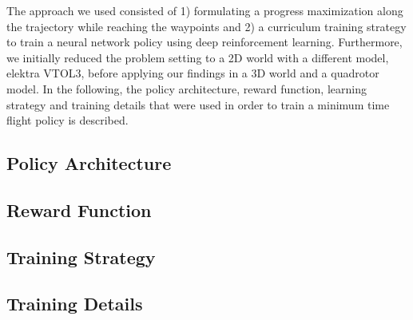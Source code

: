 The approach we used consisted of 1) formulating a progress maximization along the trajectory while reaching the waypoints and 2) a curriculum training strategy to train a neural network policy using deep reinforcement learning. Furthermore, we initially reduced the problem setting to a 2D world with a different model, elektra VTOL3, before applying our findings in a 3D world and a quadrotor model. In the following, the policy architecture, reward function, learning strategy and training details that were used in order to train a minimum time flight policy is described. 

\subsection{Policy Architecture}
\label{subsec:policy_architeture}


\subsection{Reward Function}
\label{subsec:reward_fun}


\subsection{Training Strategy} 
\label{subsec:training_strategy}


\subsection{Training Details} 
\label{subsec:training_details}
